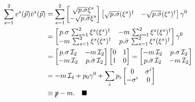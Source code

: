\documentclass{article}
\newcommand{\vecp}{\vec{p}}
\newcommand{\slashp}{\slashed{p}}
\begin{document}
\begin{equation}
    \begin{split}
        \sum_{s=1}^2 v^s(\vecp) \bar{v}^s(\vecp) &= \sum_{s=1}^2 \begin{bmatrix}
            \sqrt{p.\sigma}\xi^s \\ -\sqrt{p.\bar{\sigma}}\xi^s
        \end{bmatrix}\begin{bmatrix}
            \sqrt{p.\sigma}(\xi^s)^\dagger & -\sqrt{p.\bar{\sigma}}(\xi^s)^\dagger
        \end{bmatrix}\gamma^0 \\
        &= \begin{bmatrix}
            p.\sigma \,\sum_{s=1}^2\xi^s(\xi^s)^\dagger & -m\, \sum_{s=1}^2\xi^s(\xi^s)^\dagger \\ -m\, \sum_{s=1}^2\xi^s(\xi^s)^\dagger & p.\bar{\sigma} \, \sum_{s=1}^2\xi^s(\xi^s)^\dagger
        \end{bmatrix}\gamma^0 \\
        &= \begin{bmatrix}
            p.\sigma \,\mathcal{I}_2 & -m\, \mathcal{I}_2 \\ -m\, \mathcal{I}_2 & p.\bar{\sigma} \, \mathcal{I}_2
        \end{bmatrix}\begin{bmatrix}
            0 & 1 \\ 1 & 0
        \end{bmatrix}=\begin{bmatrix}
            -m\, \mathcal{I}_2 & p.\sigma \,\mathcal{I}_2 \\
            p.\bar{\sigma} \, \mathcal{I}_2 & -m\, \mathcal{I}_2
        \end{bmatrix} \\
        &= -m\,\mathcal{I}_4 + p_0\gamma^0 + \sum_i p_i\begin{bmatrix}
            0 & \sigma^i \\ -\sigma^i & 0
        \end{bmatrix} \\
        &\equiv \slashp - m. \quad \blacksquare
    \end{split}
\end{equation}
\end{document}
